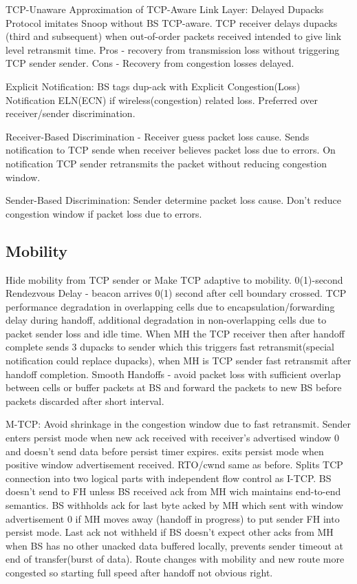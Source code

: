 \documentclass[9pt]{extarticle}
\begin{document}
\begin{multicols}{2}
TCP-Unaware Approximation of TCP-Aware Link Layer: Delayed Dupacks Protocol imitates Snoop without BS TCP-aware. TCP receiver delays dupacks (third and subsequent) when out-of-order packets received intended to give link level retransmit time. Pros - recovery from  transmission loss without triggering TCP sender sender. Cons - Recovery from congestion losses delayed.

Explicit Notification: BS tags dup-ack with Explicit Congestion(Loss) Notification ELN(ECN) if wireless(congestion) related loss.  Preferred over receiver/sender discrimination. 

Receiver-Based Discrimination - Receiver guess packet loss cause. Sends notification to TCP sende when receiver believes packet loss due to errors. On notification TCP sender retransmits the packet without reducing congestion window.

Sender-Based Discrimination: Sender determine packet loss cause. Don't reduce congestion window if packet loss due to errors.

\subsection{Mobility}

Hide mobility from TCP sender or Make TCP adaptive to mobility. 0(1)-second Rendezvous Delay - beacon arrives 0(1) second after cell boundary crossed. TCP performance degradation in overlapping cells due to encapsulation/forwarding delay during handoff, additional degradation in non-overlapping cells due to packet sender loss and idle time. When MH the TCP receiver then after handoff complete sends 3 dupacks to sender which this triggers fast retransmit(special notification could replace dupacks), when MH is TCP sender fast retransmit after handoff completion. Smooth Handoffs - avoid packet loss with sufficient overlap between cells or buffer packets at BS and forward the packets to new BS before packets discarded after short interval.

M-TCP: Avoid shrinkage in the congestion window due to fast retransmit. Sender enters persist mode when new ack received with receiver’s advertised window 0 and doesn't send data before persist timer expires. exits persist mode when positive window advertisement received. RTO/cwnd same as before. Splits TCP connection into two logical parts with independent flow control as I-TCP. BS doesn't send to FH unless BS received ack from MH wich maintains end-to-end semantics. BS withholds ack for last byte acked by MH which sent with window advertisement 0 if MH moves away (handoff in progress) to put sender FH into persist mode. Last ack not withheld if BS doesn't expect other acks from MH when BS has no other unacked data buffered locally, prevents sender timeout at end of transfer(burst of data). Route changes with mobility and new route more congested so starting full speed after handoff not obvious right.


\end{multicols}
\end{document}

